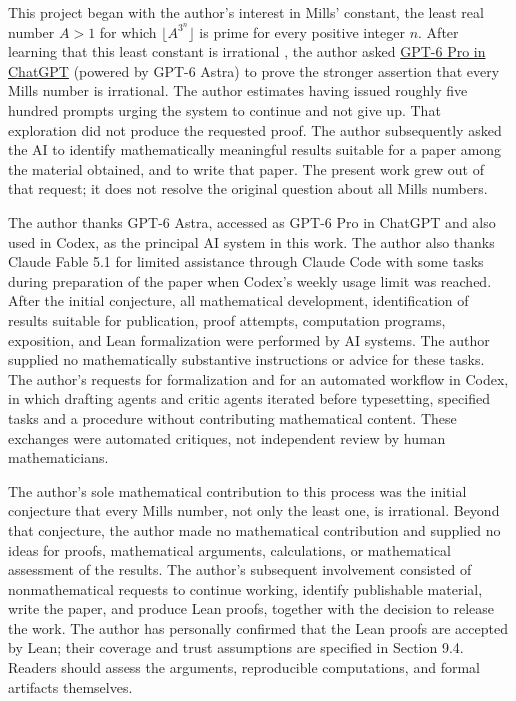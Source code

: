 \documentclass[11pt,reqno]{amsart}
\theoremstyle{definition}
\theoremstyle{remark}
\begin{document}
This project began with the author's interest in Mills' constant, the least real number \(A>1\) for which \(\lfloor A^{3^n}\rfloor\) is prime for every positive integer \(n\). After learning that this least constant is irrational \cite{SA25}, the author asked \href{https://help.openai.com/en/articles/20001354-gpt-5-6}{GPT-6 Pro in ChatGPT} (powered by GPT-6 Astra) to prove the stronger assertion that every Mills number is irrational. The author estimates having issued roughly five hundred prompts urging the system to continue and not give up. That exploration did not produce the requested proof. The author subsequently asked the AI to identify mathematically meaningful results suitable for a paper among the material obtained, and to write that paper. The present work grew out of that request; it does not resolve the original question about all Mills numbers.

The author thanks GPT-6 Astra, accessed as GPT-6 Pro in ChatGPT and also used in Codex, as the principal AI system in this work. The author also thanks Claude Fable 5.1 for limited assistance through Claude Code with some tasks during preparation of the paper when Codex's weekly usage limit was reached. After the initial conjecture, all mathematical development, identification of results suitable for publication, proof attempts, computation programs, exposition, and Lean formalization were performed by AI systems. The author supplied no mathematically substantive instructions or advice for these tasks. The author's requests for formalization and for an automated workflow in Codex, in which drafting agents and critic agents iterated before typesetting, specified tasks and a procedure without contributing mathematical content. These exchanges were automated critiques, not independent review by human mathematicians.

The author's sole mathematical contribution to this process was the initial conjecture that every Mills number, not only the least one, is irrational. Beyond that conjecture, the author made no mathematical contribution and supplied no ideas for proofs, mathematical arguments, calculations, or mathematical assessment of the results. The author's subsequent involvement consisted of nonmathematical requests to continue working, identify publishable material, write the paper, and produce Lean proofs, together with the decision to release the work. The author has personally confirmed that the Lean proofs are accepted by Lean; their coverage and trust assumptions are specified in Section 9.4. Readers should assess the arguments, reproducible computations, and formal artifacts themselves.
\end{document}
